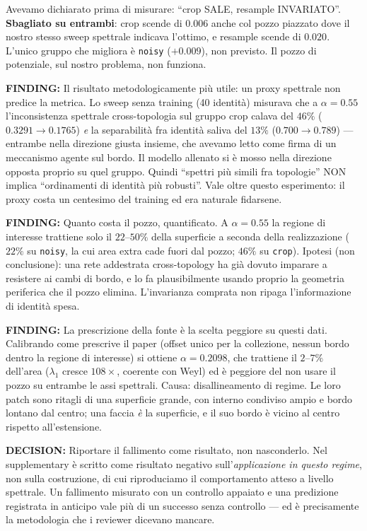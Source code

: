 \documentclass[11pt,a4paper]{article}
\newcommand{\finding}[1]{\textcolor{finding}{\textbf{FINDING:}} #1}
\newcommand{\decision}[1]{\textcolor{decision}{\textbf{DECISION:}} #1}
\begin{document}
Avevamo dichiarato prima di misurare: ``crop SALE, resample INVARIATO''. \textbf{Sbagliato su
entrambi}: crop scende di $0.006$ anche col pozzo piazzato dove il nostro stesso sweep
spettrale indicava l'ottimo, e resample scende di $0.020$. L'unico gruppo che migliora è
\texttt{noisy} ($+0.009$), non previsto. Il pozzo di potenziale, sul nostro problema, non
funziona.

\finding{Il risultato metodologicamente più utile: un proxy spettrale non predice la metrica.}
Lo sweep senza training (40 identità) misurava che a $\alpha=0.55$ l'inconsistenza spettrale
cross-topologia sul gruppo crop calava del $46\%$ ($0.3291 \to 0.1765$) \emph{e} la
separabilità fra identità saliva del $13\%$ ($0.700 \to 0.789$) --- entrambe nella direzione
giusta insieme, che avevamo letto come firma di un meccanismo agente sul bordo. Il modello
allenato si è mosso nella direzione opposta proprio su quel gruppo. Quindi ``spettri più simili
fra topologie'' NON implica ``ordinamenti di identità più robusti''. Vale oltre questo
esperimento: il proxy costa un centesimo del training ed era naturale fidarsene.

\finding{Quanto costa il pozzo, quantificato.} A $\alpha=0.55$ la regione di interesse trattiene
solo il $22$--$50\%$ della superficie a seconda della realizzazione ($22\%$ su \texttt{noisy},
la cui area extra cade fuori dal pozzo; $46\%$ su \texttt{crop}). Ipotesi (non conclusione): una
rete addestrata cross-topology ha già dovuto imparare a resistere ai cambi di bordo, e lo fa
plausibilmente usando proprio la geometria periferica che il pozzo elimina. L'invarianza
comprata non ripaga l'informazione di identità spesa.

\finding{La prescrizione della fonte è la scelta peggiore su questi dati.} Calibrando come
prescrive il paper (offset unico per la collezione, nessun bordo dentro la regione di
interesse) si ottiene $\alpha=0.2098$, che trattiene il $2$--$7\%$ dell'area ($\lambda_1$
cresce $108\times$, coerente con Weyl) ed è peggiore del non usare il pozzo su entrambe le assi
spettrali. Causa: disallineamento di regime. Le loro patch sono ritagli di una superficie
grande, con interno condiviso ampio e bordo lontano dal centro; una faccia \emph{è} la
superficie, e il suo bordo è vicino al centro rispetto all'estensione.

\decision{Riportare il fallimento come risultato, non nasconderlo.} Nel supplementary è scritto
come risultato negativo sull'\emph{applicazione in questo regime}, non sulla costruzione, di cui
riproduciamo il comportamento atteso a livello spettrale. Un fallimento misurato con un
controllo appaiato e una predizione registrata in anticipo vale più di un successo senza
controllo --- ed è precisamente la metodologia che i reviewer dicevano mancare.
\end{document}
